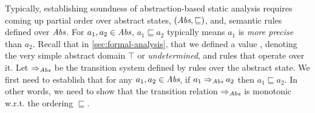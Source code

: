 Typically, establishing soundness of abstraction-based static analysis
requires coming up partial order over abstract states,
$\left(\textit{Abs}, \sqsubseteq\right)$, and, semantic rules defined over $\textit{Abs}$.
For $a_1, a_2 \in \textit{Abs}$, $a_1 \sqsubseteq a_2$ typically means $a_1$ is
\emph{more precise} than $a_2$. Recall that in \autoref{sec:formal-analysis},
that we defined a value , denoting the very simple abstract
domain $\top$ or \emph{undetermined},
and rules that operate over it. Let $\Rightarrow_{\textit{Abs}}$ be the transition
system defined by rules over the abstract state. We first need to
establish that for any $a_1, a_2 \in \textit{Abs}$, if $a_1 \Rightarrow_{\textit{Abs}} a_2$ then $a_1
\sqsubseteq a_2$. In other words, we need to show that the transition relation
$\Rightarrow_{\textit{Abs}}$ is monotonic w.r.t. the ordering $\sqsubseteq$.




%
%

